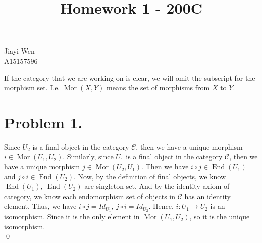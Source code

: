 \documentclass[12pt]{amsart}
\newcommand{\End}[0]{\operatorname{End}}
\newcommand{\Mor}[0]{\operatorname{Mor}}
\begin{document}
\title{Homework 1 - 200C}
\maketitle
\begin{center}
    Jiayi Wen\\
    A15157596
\end{center}
If the category that we are working on is clear, we will omit the subscript for the morphism set. I.e. $\Mor(X,Y)$ means the set of morphisms from $X$ to $Y$.
\section*{Problem 1.} Since $U_2$ is a final object in the category $\mathcal{C}$, then we have a unique morphism $i\in \Mor(U_1,U_2)$. Similarly, since $U_1$ is a final object in the category $\mathcal{C}$, then we have a unique morphism $j\in \Mor(U_2,U_1)$. Then we have
$i\circ j\in \End(U_1)$ and $j\circ i \in \End(U_2)$. Now, by the definition of final objects, we know $\End(U_1), \ \End(U_2)$ are singleton set. And by the identity axiom of category, we know each endomorphism set of objects in $\mathcal{C}$ has an identity element. Thus, we have $i\circ j= Id_{U_1},\ j\circ i =Id_{U_2}$. Hence, $i:U_1\to U_2$ is an isomorphism. Since it is the only element in $\Mor(U_1,U_2)$, so it is the unique isomorphism.
\\\qed\\
\end{document}
